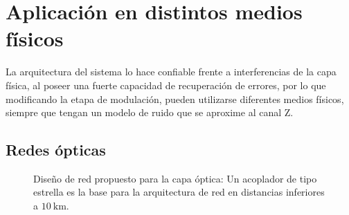 \section{Aplicación en distintos medios físicos}
La arquitectura del sistema lo hace confiable frente a interferencias de la capa física, al poseer una fuerte capacidad de recuperación de errores, por lo que modificando la etapa de modulación, pueden utilizarse diferentes medios físicos, siempre que tengan un modelo de ruido que se aproxime al canal Z.
\subsection{Redes ópticas}


\begin{figure}[t]
  \centering
    \qquad
    \caption{Diseño de red propuesto para la capa óptica: Un acoplador de tipo estrella es la base para la arquitectura de red en distancias inferiores a $10~\mathrm{km}$.}
    \label{arch:fig1}
\end{figure}




